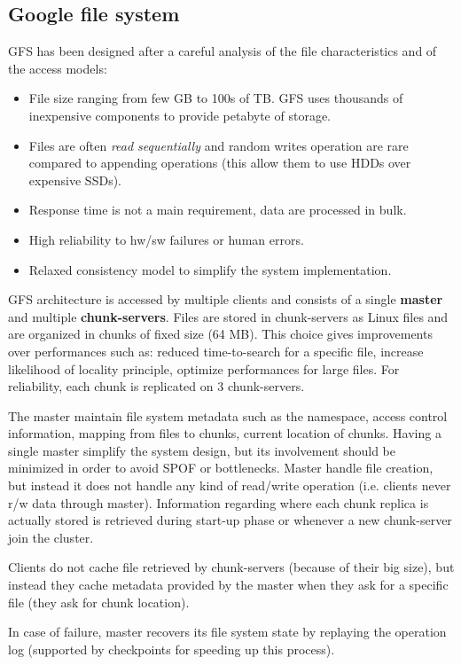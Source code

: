 \documentclass{article}
\begin{document}
\subsection{Google file system}
GFS has been designed after a careful analysis of the file characteristics and of the access models:
\begin{itemize}
    \item File size ranging from few GB to 100s of TB. GFS uses thousands of inexpensive components to provide petabyte of storage.
    \item Files are often \textit{read sequentially} and random writes operation are rare compared to appending operations (this allow them to use HDDs over expensive SSDs).
    \item Response time is not a main requirement, data are processed in bulk.
    \item High reliability to hw/sw failures or human errors.
    \item Relaxed consistency model to simplify the system implementation.
\end{itemize}

GFS architecture is accessed by multiple clients and consists of a single \textbf{master} and multiple \textbf{chunk-servers}. Files are stored in chunk-servers as Linux files and are organized in chunks of fixed size (64 MB). This choice gives improvements over performances such as: reduced time-to-search for a specific file, increase likelihood of locality principle, optimize performances for large files. For reliability, each chunk is replicated on 3 chunk-servers.

\bigskip
The master maintain file system metadata such as the namespace, access control information, mapping from files to chunks, current location of chunks. Having a single master simplify the system design, but its involvement should be minimized in order to avoid SPOF or bottlenecks. Master handle file creation, but instead it does not handle any kind of read/write operation (i.e. clients never r/w data through master). Information regarding where each chunk replica is actually stored is retrieved during start-up phase or whenever a new chunk-server join the cluster.

\bigskip
Clients do not cache file retrieved by chunk-servers (because of their big size), but instead they cache metadata provided by the master when they ask for a specific file (they ask for chunk location).

\bigskip
In case of failure, master recovers its file system state by replaying the operation log (supported by checkpoints for speeding up this process).
\end{document}
